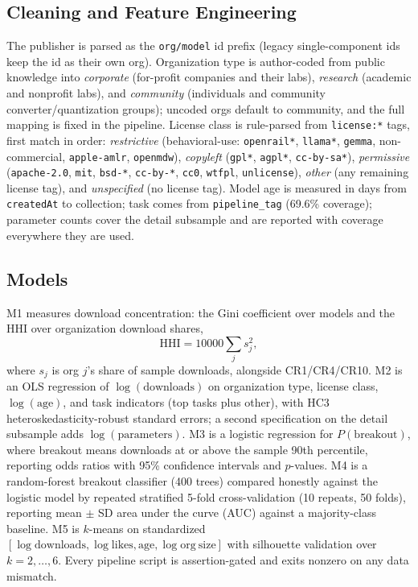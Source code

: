 \documentclass[conference]{IEEEtran}
\begin{document}
\subsection{Cleaning and Feature Engineering}
The publisher is parsed as the \texttt{org/model} id prefix (legacy
single-component ids keep the id as their own org). Organization type is
author-coded from public knowledge into \emph{corporate} (for-profit
companies and their labs), \emph{research} (academic and nonprofit labs), and
\emph{community} (individuals and community converter/quantization groups);
uncoded orgs default to community, and the full mapping is fixed in the
pipeline. License class is rule-parsed from \texttt{license:*} tags, first
match in order: \emph{restrictive} (behavioral-use: \texttt{openrail*},
\texttt{llama*}, \texttt{gemma}, non-commercial, \texttt{apple-amlr},
\texttt{openmdw}), \emph{copyleft} (\texttt{gpl*}, \texttt{agpl*},
\texttt{cc-by-sa*}), \emph{permissive} (\texttt{apache-2.0}, \texttt{mit},
\texttt{bsd-*}, \texttt{cc-by-*}, \texttt{cc0}, \texttt{wtfpl},
\texttt{unlicense}), \emph{other} (any remaining license tag), and
\emph{unspecified} (no license tag). Model age is measured in days from
\texttt{createdAt} to collection; task comes from \texttt{pipeline\_tag}
(69.6\% coverage); parameter counts cover the detail subsample and are
reported with coverage everywhere they are used.

\subsection{Models}
M1 measures download concentration: the Gini coefficient over models and the
HHI over organization download shares,
\begin{equation}
\mathrm{HHI} = 10000 \sum_j s_j^2,
\end{equation}
where $s_j$ is org $j$'s share of sample downloads, alongside CR1/CR4/CR10.
M2 is an OLS regression of $\log(\mathrm{downloads})$ on organization type,
license class, $\log(\mathrm{age})$, and task indicators (top tasks plus
other), with HC3 heteroskedasticity-robust standard errors; a second
specification on the detail subsample adds $\log(\mathrm{parameters})$.
M3 is a logistic regression for $P(\mathrm{breakout})$, where breakout means
downloads at or above the sample 90th percentile, reporting odds ratios with
95\% confidence intervals and $p$-values. M4 is a random-forest breakout
classifier (400 trees) compared honestly against the logistic model by
repeated stratified 5-fold cross-validation (10 repeats, 50 folds), reporting
mean $\pm$ SD area under the curve (AUC) against a majority-class baseline.
M5 is $k$-means on standardized $[\log \mathrm{downloads}, \log \mathrm{likes},
\mathrm{age}, \log \mathrm{org\ size}]$ with silhouette validation over
$k=2,\dots,6$. Every pipeline script is assertion-gated and exits nonzero on
any data mismatch.
\end{document}
